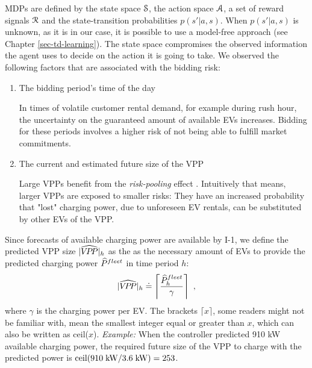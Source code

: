 \documentclass[a4paper, 12pt]{article}
\let\cite\shortcite
\begin{document}
MDPs are defined by the state space \(\S\), the action space \(\A\), a set of reward
signals \(\R\) and the state-transition probabilities \(p(s'|a,s)\). When
\(p(s'|a,s)\) is unknown, as it is in our case, it is possible to use a
model-free approach (see Chapter \ref{sec-td-learning}). The state space
compromises the observed information the agent uses to decide on the action it
is going to take. We observed the following factors that are associated with the
bidding risk:
\begin{enumerate}
\item The bidding period's time of the day

In times of volatile customer rental demand, for example during rush hour,
the uncertainty on the guaranteed amount of available EVs increases. Bidding
for these periods involves a higher risk of not being able to fulfill market
commitments.
\item The current and estimated future size of the VPP

Large VPPs benefit from the \emph{risk-pooling} effect \cite{kahlen17_fleet}.
Intuitively that means, larger VPPs are exposed to smaller risks: They have
an increased probability that "lost" charging power, due to unforeseen EV
rentals, can be substituted by other EVs of the VPP.
\end{enumerate}
Since forecasts of available charging power are available by I-1, we define the
predicted VPP size \(\vpphat{h}\) as the as the necessary amount of EVs to provide
the predicted charging power \(\fPhat{}\) in time period \(h\):
\begin{equation}
    \vpphat{h} \defeq \left\lceil\frac{\fPhat{h}}{\gamma}\right\rceil \text{ ,}
\end{equation}
where \(\gamma\) is the charging power per EV. The brackets \(\lceil x \rceil\),
some readers might not be familiar with, mean the smallest integer equal or
greater than \(x\), which can also be written as ceil(\(x\)). \emph{Example:} When the
controller predicted 910 kW available charging power, the required future size
of the VPP to charge with the predicted power is \(\text{ceil}(910\;\kw/3.6\;\kw)
= 253\).
\end{document}
